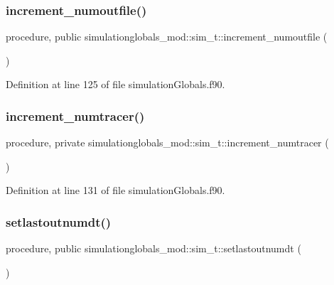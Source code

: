 \subsubsection{\texorpdfstring{increment\+\_\+numoutfile()}{increment\_numoutfile()}}
{\footnotesize\ttfamily procedure, public simulationglobals\+\_\+mod\+::sim\+\_\+t\+::increment\+\_\+numoutfile (\begin{DoxyParamCaption}{ }\end{DoxyParamCaption})}



Definition at line 125 of file simulation\+Globals.\+f90.

\mbox{\label{structsimulationglobals__mod_1_1sim__t_afef25e0feaad4ec1cff7afd93bc53812}} 
\subsubsection{\texorpdfstring{increment\+\_\+numtracer()}{increment\_numtracer()}}
{\footnotesize\ttfamily procedure, private simulationglobals\+\_\+mod\+::sim\+\_\+t\+::increment\+\_\+numtracer (\begin{DoxyParamCaption}{ }\end{DoxyParamCaption})\hspace{0.3cm}{\ttfamily [private]}}



Definition at line 131 of file simulation\+Globals.\+f90.

\mbox{\label{structsimulationglobals__mod_1_1sim__t_a4147b0aec912a4a02d56dcffaad2867c}} 
\subsubsection{\texorpdfstring{setlastoutnumdt()}{setlastoutnumdt()}}
{\footnotesize\ttfamily procedure, public simulationglobals\+\_\+mod\+::sim\+\_\+t\+::setlastoutnumdt (\begin{DoxyParamCaption}{ }\end{DoxyParamCaption})}




